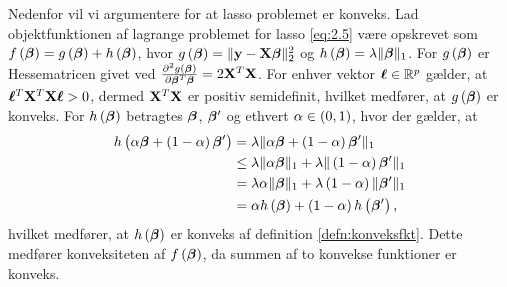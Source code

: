Nedenfor vil vi argumentere for at lasso problemet er konveks.
Lad objektfunktionen af lagrange problemet for lasso \eqref{eq:2.5} være opskrevet som \(f \del{\tbeta} = g \del{\tbeta} + h \del{\tbeta}\),
hvor \(g \del{\tbeta} =\Vert \y - \X \tbeta \Vert_2^2\) og \(h \del{\tbeta} = \lambda \Vert \tbeta \Vert_1\).
For \(g \del{\tbeta}\) er Hessematricen givet ved \(\frac{\partial^2 g \del{\tbeta}}{\partial \tbeta^T \tbeta}  = 2\X^T \X \).
For enhver vektor \(\boldsymbol{\ell} \in \mathbb{R}^p\) gælder, at \(\boldsymbol{\ell}^T \mathbf{X}^T \mathbf{X} \boldsymbol{\ell} > 0\), dermed \( \mathbf{X}^T \mathbf{X} \) er positiv semidefinit, hvilket medfører, at \(g \del{\tbeta}\) er konveks.
For \(h \del{\tbeta}\) betragtes \(\boldsymbol{\beta}\), \(\boldsymbol{\beta}'\) og ethvert \(\alpha \in \del{0,1}\), hvor der gælder, at
\begin{align*}
h \del{\alpha \tbeta + \del{1-\alpha}\tbeta'} &= \lambda \Vert \alpha \tbeta + \del{1-\alpha} \tbeta' \Vert_1 \\
&\leq \lambda \Vert \alpha \tbeta \Vert_1 + \lambda \Vert \del{1-\alpha} \tbeta' \Vert_1 \\
&= \lambda \alpha \Vert \tbeta \Vert_1 + \lambda \del{1-\alpha} \Vert \tbeta' \Vert_1 \\
&= \alpha h \del{\tbeta} + \del{1-\alpha} h \del{\tbeta'},
\end{align*}
hvilket medfører, at \(h \del{\tbeta}\) er konveks af definition \ref{defn:konveksfkt}.
Dette medfører konveksiteten af \(f \del{\tbeta}\), da summen af to konvekse funktioner er konveks. 

